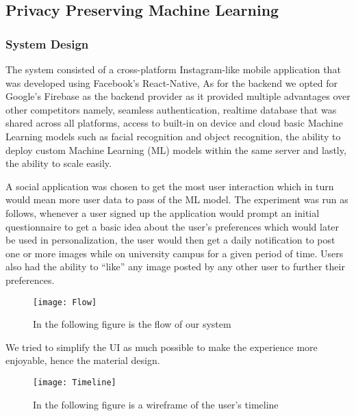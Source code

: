 \documentclass[10pt]{article}
\begin{document}
\subsection{Privacy Preserving Machine Learning}
\subsubsection{System Design}
The system consisted of a cross-platform Instagram-like mobile application that was developed using Facebook's React-Native, As for the backend we opted for Google's Firebase as the backend provider as it provided multiple advantages over other competitors namely, seamless authentication,
realtime database that was shared across all platforms, access to built-in on device and cloud basic Machine Learning models such as facial recognition and object recognition, the ability to deploy custom Machine Learning (ML) models within the same server and lastly, the ability to scale easily.


A social application was chosen to get the most user interaction which in turn would mean more user data to pass of the ML model.
The experiment was run as follows, whenever a user signed up the application would prompt an initial questionnaire to get a basic idea about the user’s preferences which would later be used in personalization,
the user would then  get a daily notification to post one or more images while on university campus for a given period of time.
Users also had the ability to “like” any image posted by any other user to further their preferences. 
\begin{figure}[H]
\centering
\texttt{[image: Flow]}
\caption{In the following figure is the flow of our system}
\label{fig:flow}
\end{figure}
We tried to simplify the UI as much possible to make the experience more enjoyable, hence the material design.
\begin{figure}[H]
\centering
\texttt{[image: Timeline]}
\caption{In the following figure is a wireframe of the user's timeline }
\label{fig:Timeline}
\end{figure}
\end{document}
